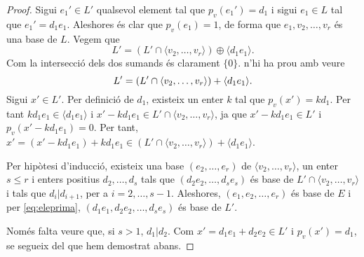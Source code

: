 \documentclass[../main.tex]{subfiles}
\begin{document}
\begin{proof}
Sigui $e_1'\in L'$ qualsevol element tal que $p_v(e_1') = d_1$ i sigui $e_1\in L$ tal que $e_1' = d_1e_1$. Aleshores és clar que $p_v(e_1)=1$, de forma que $e_1,v_2,\ldots,v_r$ és una base de $L$. Vegem que
\begin{equation}
    \label{eq:eleprima}
    L' = (L'\cap\langle v_2,\ldots,v_r\rangle)\oplus\langle d_1e_1\rangle .
\end{equation}
Com la intersecció dels dos sumands és clarament $\{0\}$. n'hi ha prou amb veure 
\begin{equation}
    \notag
    L' = (L'\cap \langle v_2,\ldots,v_r\rangle)+\langle d_1e_1\rangle.
\end{equation}
Sigui $x'\in L'$. Per definició de $d_1$, existeix un enter $k$ tal que $p_v(x') = kd_1$. Per tant $kd_1e_1\in \langle d_1e_1\rangle$ i $x'-kd_1e_1\in L'\cap \langle v_2,\ldots,v_r\rangle$, ja que $x'-kd_1e_1\in L'$ i $p_v(x'-kd_1e_1) = 0$. Per tant, $x' = (x'-kd_1e_1)+kd_1e_1\in (L'\cap \langle v_2,\ldots,v_r\rangle)+\langle d_1e_1\rangle$.

Per hipòtesi d'inducció, existeix una base $(e_2,\ldots,e_r)$ de $\langle v_2,\ldots, v_r\rangle$, un enter $s\leq r$ i enters positius $d_2,\ldots, d_s$ tals que $(d_2e_2,\ldots,d_se_s)$ és base de $L'\cap \langle v_2,\ldots, v_r\rangle$ i tals que $d_i|d_{i+1}$, per a $i=2,\ldots,s-1$. Aleshores, $(e_1,e_2,\ldots,e_r)$ és base de $E$ i per \ref{eq:eleprima}, $(d_1e_1,d_2e_2,\ldots,d_se_s)$ és base de $L'$.

Només falta veure que, si $s>1$, $d_1|d_2$. Com $x' = d_1e_1+d_2e_2\in L'$ i $p_v(x') = d_1$, se segueix del que hem demostrat abans.
\end{proof}
\end{document}
